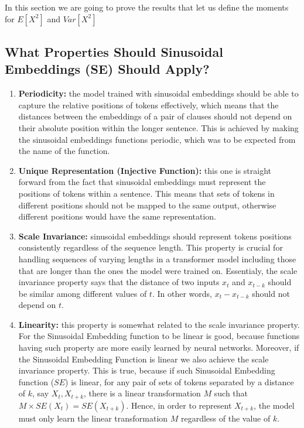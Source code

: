 \documentclass{article}
\begin{document}
In this section we are going to prove the results that let us define the moments for $E[X^2]$ and $Var[X^2]$
\subsection{What Properties Should Sinusoidal Embeddings (SE) Should Apply?}

\begin{enumerate}
	\item \textbf{Periodicity:} the model trained with sinusoidal embeddings should be able to capture the relative positions of tokens effectively, which means that the distances between the embeddings of a pair of clauses should not depend on their absolute position within the longer sentence. This is achieved by making the sinusoidal embeddings functions periodic, which was to be expected from the name of the function. 
	\item \textbf{Unique Representation (Injective Function):} this one is straight forward from the fact that  sinusoidal embeddings must represent the positions of tokens within a sentence. This means that sets of tokens in different positions should not be mapped to the same output, otherwise different positions would have the same representation.
	\item \textbf{Scale Invariance:} sinusoidal embeddings should represent tokens positions consistently regardless of the sequence length. This property is crucial for handling sequences of varying lengths in a transformer model including those that are longer than the ones the model were trained on. Essentialy, the scale invariance property says that the distance of two inputs $x_t$ and $x_{t - k}$ should be similar among different values of $t$. In other words, $x_t - x_{t - k}$ should not depend on $t$.
	\item \textbf{Linearity:} this property is somewhat related to the scale invariance property. For the Sinusoidal Embedding function to be linear is good, because functions having such property are more easily learned by neural networks. Moreover, if the Sinusoidal Embedding Function is linear we also achieve the scale invariance property. This is true, because if such Sinusoidal Embedding function ($SE$) is linear, for any pair of sets of tokens separated by a distance of $k$, say $X_t, X_{t+k}$, there is a linear transformation $M$ such that $M \times SE(X_t) = SE(X_{t+k})$. Hence, in order to represent $X_{t+k}$,  the model must only learn the linear transformation $M$ regardless of the value of $k$. 
\end{enumerate}
\end{document}
